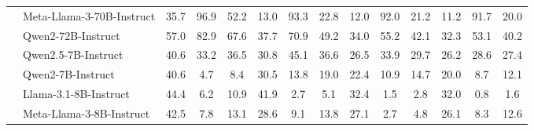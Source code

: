 \begin{table*}[h]
{\begin{tabular}{cccccccccccccc}
\multicolumn{1}{c|}{\multirow{13}{*}{}} &\multicolumn{1}{l}{Meta-Llama-3-70B-Instruct} & 35.7 & 96.9 & 52.2 & 13.0 & 93.3 & 22.8 & 12.0 & 92.0 & 21.2 & 11.2 & 91.7 & 20.0 \\
\multicolumn{1}{c|}{\multirow{13}{*}{}} & \multicolumn{1}{l}{Qwen2-72B-Instruct} & 57.0 & 82.9 & 67.6 & 37.7 & 70.9 & 49.2 & 34.0 & 55.2 & 42.1 & 32.3 & 53.1 & 40.2 \\
\multicolumn{1}{c|}{\multirow{13}{*}{}} & \multicolumn{1}{l}{Qwen2.5-7B-Instruct} & 40.6 & 33.2 & 36.5 & 30.8 & 45.1 & 36.6 & 26.5 & 33.9 & 29.7 & 26.2 & 28.6 & 27.4\\ 
\multicolumn{1}{c|}{\multirow{13}{*}{}} &\multicolumn{1}{l}{ Qwen2-7B-Instruct} & 40.6 & 4.7 & 8.4 & 30.5 & 13.8 & 19.0 & 22.4 & 10.9 & 14.7 & 20.0 & 8.7 & 12.1 \\
\multicolumn{1}{c|}{\multirow{13}{*}{}} &\multicolumn{1}{l}{ Llama-3.1-8B-Instruct} & 44.4 & 6.2 & 10.9 & 41.9 & 2.7 & 5.1 & 32.4 & 1.5 & 2.8 & 32.0 & 0.8 & 1.6 \\
\multicolumn{1}{c|}{\multirow{13}{*}{}} &\multicolumn{1}{l}{Meta-Llama-3-8B-Instruct} & 42.5 & 7.8 & 13.1 & 28.6 & 9.1 & 13.8 & 27.1 & 2.7 & 4.8 & 26.1 & 8.3 & 12.6 \\

\hline

\end{tabular}
\vspace{-5pt}
}

\end{table*}


